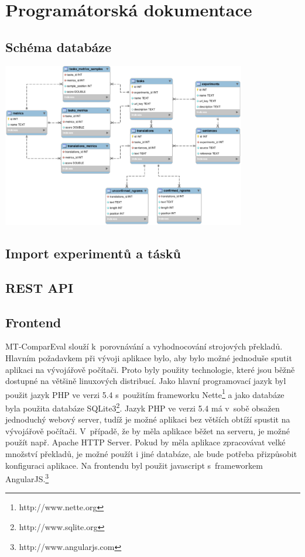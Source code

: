 \chapter{Programátorská dokumentace}
\label{chap:programmers}

\section{Schéma databáze}
\centerline{\mbox{\includegraphics[width=0.8\textwidth]{img/schema.eps}}}
\section{Import experimentů a tásků}
\section{REST API}
\section{Frontend}

MT-ComparEval slouží k~porovnávání a vyhodnocování strojových překladů.
Hlavním požadavkem při vývoji aplikace bylo,
  aby bylo možné jednoduše sputit aplikaci na vývojářově počítači.
Proto byly použity technologie,
  které jsou běžně dostupné na většině linuxových distribucí.
Jako hlavní programovací jazyk byl použit jazyk PHP ve verzi 5.4 
  s~použitím frameworku Nette\footnote{http://www.nette.org}
  a jako databáze byla použita databáze SQLite3\footnote{http://www.sqlite.org}.
Jazyk PHP ve verzi 5.4 má v~sobě obsažen jednoduchý webový server,
  tudíž je možné aplikaci bez větších obtíží spustit na vývojářově počítači.
V~případě, že by měla aplikace běžet na serveru,
  je možné použít např. Apache HTTP Server.
Pokud by měla aplikace zpracovávat velké množství překladů,
  je možné použít i jiné databáze,
  ale bude potřeba přizpůsobit konfiguraci aplikace.
Na frontendu byl použit javascript s~frameworkem AngularJS.\footnote{http://www.angularjs.com}



